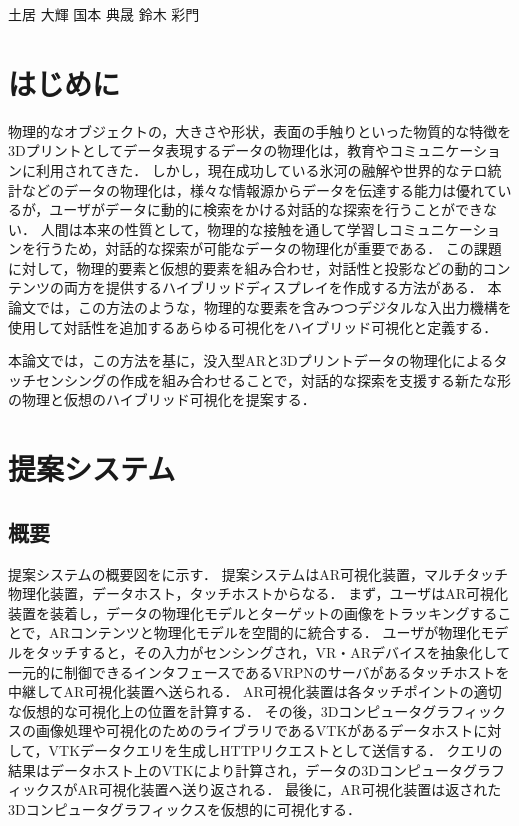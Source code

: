 \documentclass[a4paper,10pt,twocolumn,uplatex]{jsarticle}
\date{10}
\begin{document}
{土居 大輝}
{国本 典晟}
{鈴木 彩門}

\section{はじめに}
物理的なオブジェクトの，大きさや形状，表面の手触りといった物質的な特徴を3Dプリントとしてデータ表現するデータの物理化は，教育やコミュニケーションに利用されてきた．
しかし，現在成功している氷河の融解や世界的なテロ統計などのデータの物理化は，様々な情報源からデータを伝達する能力は優れているが，ユーザがデータに動的に検索をかける対話的な探索を行うことができない．
人間は本来の性質として，物理的な接触を通して学習しコミュニケーションを行うため，対話的な探索が可能なデータの物理化が重要である．
この課題に対して，物理的要素と仮想的要素を組み合わせ，対話性と投影などの動的コンテンツの両方を提供するハイブリッドディスプレイを作成する方法\cite{hybrid}がある．
本論文では，この方法のような，物理的な要素を含みつつデジタルな入出力機構を使用して対話性を追加するあらゆる可視化をハイブリッド可視化と定義する．\par
本論文では，この方法を基に，没入型ARと3Dプリントデータの物理化によるタッチセンシングの作成を組み合わせることで，対話的な探索を支援する新たな形の物理と仮想のハイブリッド可視化を提案する．

\section{提案システム}
\subsection{概要}
\label{概要}
提案システムの概要図をに示す．
提案システムはAR可視化装置，マルチタッチ物理化装置，データホスト，タッチホストからなる．
まず，ユーザはAR可視化装置を装着し，データの物理化モデルとターゲットの画像をトラッキングすることで，ARコンテンツと物理化モデルを空間的に統合する．
ユーザが物理化モデルをタッチすると，その入力がセンシングされ，VR・ARデバイスを抽象化して一元的に制御できるインタフェースであるVRPNのサーバがあるタッチホストを中継してAR可視化装置へ送られる．
AR可視化装置は各タッチポイントの適切な仮想的な可視化上の位置を計算する．
その後，3Dコンピュータグラフィックスの画像処理や可視化のためのライブラリであるVTKがあるデータホストに対して，VTKデータクエリを生成しHTTPリクエストとして送信する．
クエリの結果はデータホスト上のVTKにより計算され，データの3DコンピュータグラフィックスがAR可視化装置へ送り返される．
最後に，AR可視化装置は返された3Dコンピュータグラフィックスを仮想的に可視化する．
\end{document}
